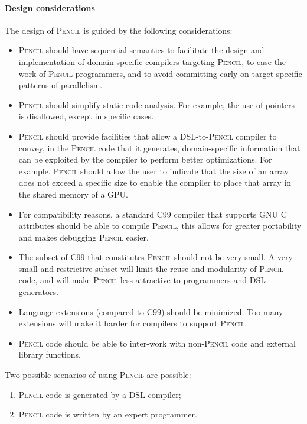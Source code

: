 \documentclass{carp}
\newcommand\pencil{\textsc{Pencil}\xspace}
\begin{document}
\paragraph*{Design considerations}
The design of \pencil is guided by the following considerations:
\begin{itemize}
\item \pencil should have sequential semantics to facilitate the
  design and implementation of domain-specific compilers targeting
  \pencil, to ease the work of \pencil programmers, and to avoid committing
  early on target-specific patterns of parallelism.

\item \pencil should simplify static code analysis.  For example, the
  use of pointers is disallowed, except in specific cases.

\item \pencil should provide facilities that allow a DSL-to-\pencil
  compiler to convey, in the \pencil code that it generates,
  domain-specific information that can be exploited by the
  compiler to perform better optimizations.  For example, \pencil
  should allow the user to indicate that the size of an array does not
  exceed a specific size to enable the compiler to place
  that array in the shared memory of a GPU.

\item For compatibility reasons, a standard C99 compiler that supports
  GNU C attributes should be able to compile \pencil, this allows for
  greater portability and makes debugging \pencil easier.

\item The subset of C99 that constitutes \pencil should not be very
  small.  A very small and restrictive subset will limit the reuse and
  modularity of \pencil code, and will make
  \pencil less attractive to programmers and DSL generators.

\item Language extensions (compared to C99) should be minimized.
  Too many extensions will make it harder for compilers
  to support \pencil.

\item \pencil code should be able to inter-work with non-\pencil code
  and external library functions.
\end{itemize}

Two possible scenarios of using \pencil are possible:
\begin{enumerate}
\item \pencil code is generated by a DSL compiler;
\item \pencil code is written by an expert programmer.
\end{enumerate}
\end{document}
